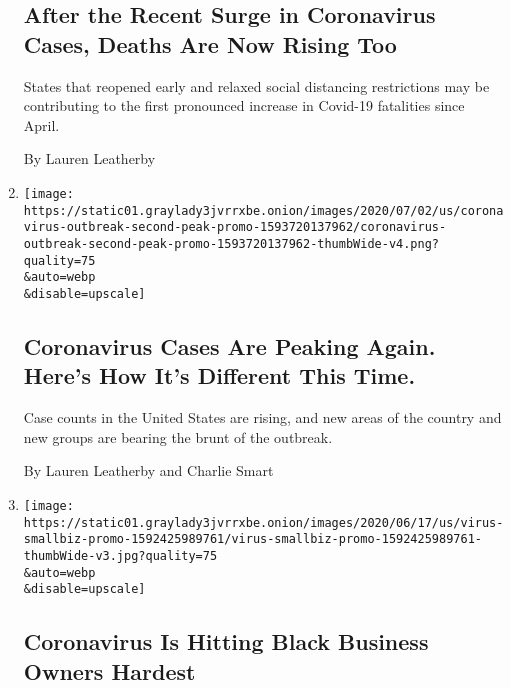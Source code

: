 \begin{enumerate}
  \hypertarget{after-the-recent-surge-in-coronavirus-cases-deaths-are-now-rising-too}{%
  \subsection{After the Recent Surge in Coronavirus Cases, Deaths Are
  Now Rising
  Too}\label{after-the-recent-surge-in-coronavirus-cases-deaths-are-now-rising-too}}

  States that reopened early and relaxed social distancing restrictions
  may be contributing to the first pronounced increase in Covid-19
  fatalities since April.

  By Lauren Leatherby
\item
  \href{/interactive/2020/07/02/us/coronavirus-cases-increase.html}{}

  \texttt{[image: https://static01.graylady3jvrrxbe.onion/images/2020/07/02/us/coronavirus-outbreak-second-peak-promo-1593720137962/coronavirus-outbreak-second-peak-promo-1593720137962-thumbWide-v4.png?quality=75\\\&auto=webp\\\&disable=upscale]}

  \hypertarget{coronavirus-cases-are-peaking-again-heres-how-its-different-this-time}{%
  \subsection{Coronavirus Cases Are Peaking Again. Here's How It's
  Different This
  Time.}\label{coronavirus-cases-are-peaking-again-heres-how-its-different-this-time}}

  Case counts in the United States are rising, and new areas of the
  country and new groups are bearing the brunt of the outbreak.

  By Lauren Leatherby and Charlie Smart
\item
  \href{/interactive/2020/06/18/us/coronavirus-black-owned-small-business.html}{}

  \texttt{[image: https://static01.graylady3jvrrxbe.onion/images/2020/06/17/us/virus-smallbiz-promo-1592425989761/virus-smallbiz-promo-1592425989761-thumbWide-v3.jpg?quality=75\\\&auto=webp\\\&disable=upscale]}

  \hypertarget{coronavirus-is-hitting-black-business-owners-hardest}{%
  \subsection{Coronavirus Is Hitting Black Business Owners
  Hardest}\label{coronavirus-is-hitting-black-business-owners-hardest}}


\end{enumerate}
